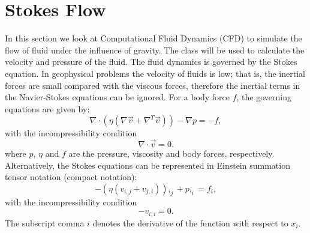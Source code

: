 
%
%
%

\section{Stokes Flow}
\label{STOKES FLOW CHAP}
In this section we look at Computational Fluid Dynamics (CFD) to simulate
the flow of fluid under the influence of gravity.
The  class will be used to calculate the velocity
and pressure of the fluid.
The fluid dynamics is governed by the Stokes equation. In geophysical problems
the velocity of fluids is low; that is, the inertial forces are small compared
with the viscous forces, therefore the inertial terms in the Navier-Stokes
equations can be ignored.
For a body force $f$, the governing equations are given by:
%
\begin{equation}
\nabla \cdot (\eta(\nabla \vec{v} + \nabla^{T} \vec{v})) - \nabla p = -f,
\label{GENERAL NAVIER STOKES}
\end{equation}
%
with the incompressibility condition
%
\begin{equation}
\nabla \cdot \vec{v} = 0.
\label{INCOMPRESSIBILITY}
\end{equation}
%
where $p$, $\eta$ and $f$ are the pressure, viscosity and body forces, respectively.
Alternatively, the Stokes equations can be represented in Einstein summation
tensor notation (compact notation):
%
\begin{equation}
-(\eta(v_{i,j} + v_{j,i})),_{j} + p,_{i} = f_{i},
\label{GENERAL NAVIER STOKES COM}
\end{equation}
%
with the incompressibility condition
%
\begin{equation}
-v_{i,i} = 0.
\label{INCOMPRESSIBILITY COM}
\end{equation}
%
The subscript comma $i$ denotes the derivative of the function with respect to $x_{i}$.

